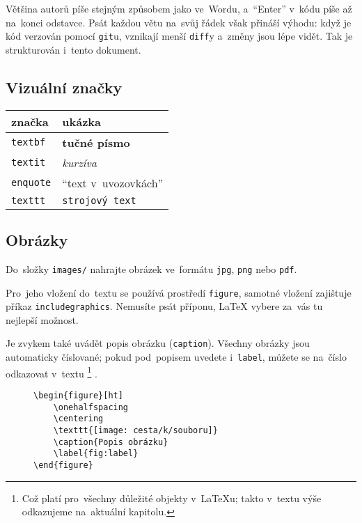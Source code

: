 Většina autorů píše stejným způsobem jako ve~Wordu, a~\enquote{Enter} v~kódu píše až na~konci odstavce.
Psát každou větu na~svůj řádek však přináší výhodu: když je kód verzován pomocí \texttt{git}u, vznikají menší \texttt{diff}y a~změny jsou lépe vidět.
Tak je strukturován i~tento dokument.
 
\subsection{Vizuální značky}

\begin{table}[ht]
\centering
\begin{tabular}{|l|l|}
značka & ukázka \\
\hline \hline
\texttt{textbf} & \textbf{tučné písmo} \\
\texttt{textit} & \emph{kurzíva} \\
\texttt{enquote} & \enquote{text v~uvozovkách} \\
\texttt{texttt} & \texttt{strojový text} \\
\end{tabular}
\end{table}

\subsection{Obrázky}
\label{sec:obrazky}

Do~složky \texttt{images/} nahrajte obrázek ve~formátu \texttt{jpg}, \texttt{png} nebo \texttt{pdf}.

Pro~jeho vložení do~textu se používá prostředí \texttt{figure}, samotné vložení zajištuje příkaz \texttt{includegraphics}.
Nemusíte psát příponu, \LaTeX{} vybere za~vás tu nejlepší možnost.

Je zvykem také uvádět popis obrázku (\texttt{caption}).
Všechny obrázky jsou automaticky číslované; pokud pod~popisem uvedete i~\texttt{label}, můžete se na~číslo odkazovat v~textu%
\footnote{Což platí pro~všechny důležité objekty v~\LaTeX{}u; takto v~textu výše odkazujeme na~aktuální kapitolu.}%
.

\begin{figure}[ht]
\begin{mdframed}
\onehalfspacing
\begin{verbatim}
\begin{figure}[ht]
    \onehalfspacing
    \centering
    \texttt{[image: cesta/k/souboru]} 
    \caption{Popis obrázku}
    \label{fig:label}
\end{figure}
\end{verbatim}
\end{mdframed}
\end{figure}
\FloatBarrier

